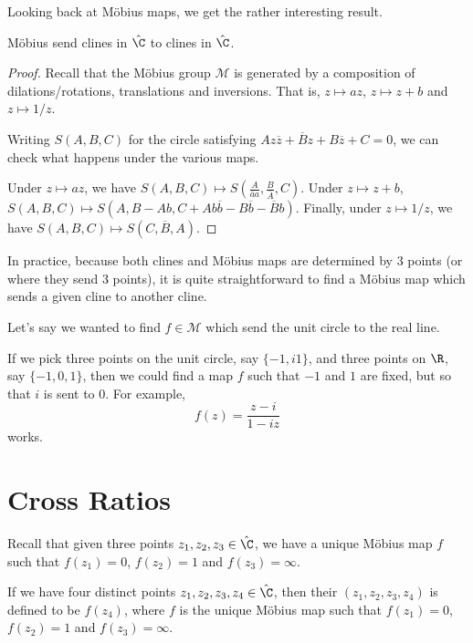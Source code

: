 \documentclass[a4]{scrreprt}
\begin{document}
Looking back at Möbius maps, we get the rather interesting result.
\begin{theorem}
	Möbius send clines in $\hat{\C}$ to clines in $\hat{\C}$.
\end{theorem}
\begin{proof}
	Recall that the Möbius group $\mathcal{M}$ is generated by a composition of dilations/rotations, translations and inversions. That is, $z \mapsto az$, $z \mapsto z + b$ and $z \mapsto 1/z$.

	Writing $S(A, B, C)$ for the circle satisfying $A z \overline{z} + \overline{B}z + B \overline{z} + C = 0$, we can check what happens under the various maps.

	Under $z \mapsto az$, we have $S(A, B, C) \mapsto S\left(\frac{A}{\overline{a}a}, \frac{B}{\overline{A}}, C\right)$. Under $z \mapsto z + b$, $S(A, B, C) \mapsto S(A, B - Ab, C + A b \overline{b} - B \overline{b} - \overline{B} b)$. Finally, under $z \mapsto 1/z$, we have $S(A, B, C) \mapsto S(C, \overline{B}, A)$.
\end{proof}

In practice, because both clines and Möbius maps are determined by 3 points (or where they send 3 points), it is quite straightforward to find a Möbius map which sends a given cline to another cline.

\begin{example}
	Let's say we wanted to find $f \in \mathcal{M}$ which send the unit circle to the real line.

	If we pick three points on the unit circle, say $\{-1, i 1\}$, and three points on $\R$, say $\{-1, 0, 1\}$, then we could find a map $f$ such that $-1$ and $1$ are fixed, but so that $i$ is sent to $0$. For example,
	$$
	f(z) = \frac{z - i}{1 - iz}
	$$
	works.
\end{example}

\section{Cross Ratios}

Recall that given three points $z_1, z_2, z_3 \in \hat{\C}$, we have a unique Möbius map $f$ such that $f(z_1) = 0$, $f(z_2) = 1$ and $f(z_3) = \infty$.

\begin{definition}
	If we have four distinct points $z_1, z_2, z_3, z_4 \in \hat{\C}$, then their  $(z_1, z_2, z_3, z_4)$ is defined to be $f(z_4)$, where $f$ is the unique Möbius map such that $f(z_1) = 0$, $f(z_2) = 1$ and $f(z_3) = \infty$.
\end{definition}
\end{document}
